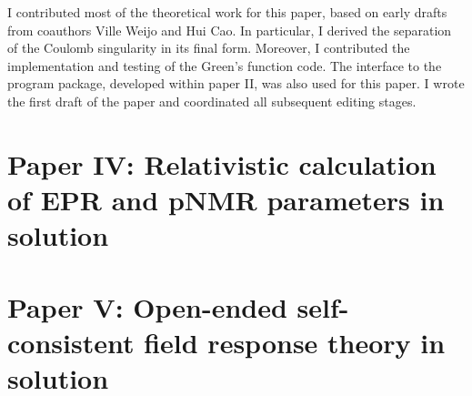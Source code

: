 I contributed most of the theoretical work for this paper, based on early drafts from coauthors
Ville Weijo and Hui Cao. In particular, I derived the separation of
the Coulomb singularity in its final form.
Moreover, I contributed the implementation and testing of the Green's function code.
The interface to the \LSDALTON program package, developed within paper II, was
also used for this paper.
I wrote the first draft of the paper and coordinated all subsequent editing stages.

\section*{Paper IV: Relativistic calculation of EPR and pNMR parameters in solution}

\section*{Paper V: Open-ended self-consistent field response theory in solution}
